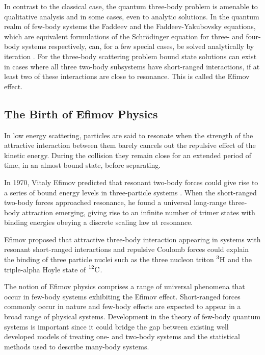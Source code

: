 \documentclass{article}
\numberwithin{equation}{section}
\begin{document}
In contrast to the classical case, the quantum three-body problem is amenable to qualitative analysis \cite{efimov1990qualitative} and in some cases, even to analytic solutions. In the quantum realm of few-body systems the Faddeev and the Faddeev-Yakubovsky equations, which are equivalent formulations of the Schr{\"o}dinger equation for three- and four-body systems respectively, can, for a few special cases, be solved analytically by iteration \cite{Faddeev:1960su, Zubarev:1994}. For the three-body scattering problem bound state solutions can exist in cases where all three two-body subsystems have short-ranged interactions, if at least two of these interactions are close to resonance. This is called the Efimov effect. 

\subsection{The Birth of Efimov Physics}
In low energy scattering, particles are said to resonate when the strength of the attractive interaction between them barely cancels out the repulsive effect of the kinetic energy. During the collision they remain close for an extended period of time, in an almost bound state, before separating. 

In 1970, Vitaly Efimov predicted that resonant two-body forces could give rise to a series of bound energy levels in three-particle systems \cite{Efimov:1970zz}. When the short-ranged two-body forces approached resonance, he found a universal long-range three-body attraction emerging, giving rise to an infinite number of trimer states with binding energies obeying a discrete scaling law at resonance.  
 
Efimov proposed that attractive three-body interaction appearing in systems with resonant short-ranged interactions and repulsive Coulomb forces could explain the binding of three particle nuclei such as the three nucleon triton $\prescript{3}{}{\mathrm{H}}$ and the triple-alpha Hoyle state of $\prescript{12}{}{\mathrm{C}}$.

The notion of Efimov physics comprises a range of universal phenomena that occur in few-body systems exhibiting the Efimov effect. Short-ranged forces commonly occur in nature and few-body effects are expected to appear in a broad range of physical systems. Development in the theory of few-body quantum systems is important since it could bridge the gap between existing well developed models of treating one- and two-body systems and the statistical methods used to describe many-body systems.
\end{document}
